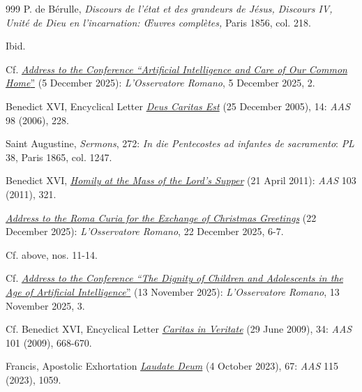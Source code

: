 \documentclass{article}
\begin{document}
\begin{thebibliography}{999}
 P. de Bérulle, \emph{Discours de l'état et des grandeurs de Jésus, Discours IV, Unité de Dieu en l'incarnation: Œuvres complètes,} Paris 1856, col. 218.

 Ibid.

 Cf. \href{https://www.vatican.va/content/leo-xiv/en/speeches/2025/december/documents/20251205-conferenza.html}{\emph{Address to the Conference ``Artificial Intelligence and Care of Our Common Home}''} (5 December 2025): \emph{L'Osservatore Romano}, 5 December 2025, 2.

 Benedict XVI, Encyclical Letter \href{https://www.vatican.va/content/benedict-xvi/en/encyclicals/documents/hf_ben-xvi_enc_20051225_deus-caritas-est.html}{\emph{Deus Caritas Est}} (25 December 2005), 14: \emph{AAS} 98 (2006), 228.

 Saint Augustine, \emph{Sermons}, 272: \emph{In die Pentecostes ad infantes de sacramento}: \emph{PL} 38, Paris 1865, col. 1247.

 Benedict XVI, \href{https://www.vatican.va/content/benedict-xvi/en/homilies/2011/documents/hf_ben-xvi_hom_20110421_coena-domini.html}{\emph{Homily at the Mass of the Lord's Supper}} (21 April 2011): \emph{AAS} 103 (2011), 321.

 \emph{\href{https://www.vatican.va/content/leo-xiv/en/speeches/2025/december/documents/20251222-curia-romana.html}{Address to the Roma Curia for the Exchange of Christmas Greetings}} (22 December 2025): \emph{L'Osservatore Romano}, 22 December 2025, 6-7.

 Cf. above, nos. 11-14.

 Cf. \href{https://www.vatican.va/content/leo-xiv/en/speeches/2025/november/documents/20251113-fondazione-infanzia-adolescenza.html}{\emph{Address to the Conference ``The Dignity of Children and Adolescents in the Age of Artificial Intelligence}''} (13 November 2025): \emph{L'Osservatore Romano}, 13 November 2025, 3.

 Cf. Benedict XVI, Encyclical Letter \href{https://www.vatican.va/content/benedict-xvi/en/encyclicals/documents/hf_ben-xvi_enc_20090629_caritas-in-veritate.html}{\emph{Caritas in Veritate}} (29 June 2009), 34: \emph{AAS} 101 (2009), 668-670.

 Francis, Apostolic Exhortation \href{https://www.vatican.va/content/francesco/en/apost_exhortations/documents/20231004-laudate-deum.html}{\emph{Laudate Deum}} (4 October 2023), 67: \emph{AAS} 115 (2023), 1059.


\end{thebibliography}
\end{document}
